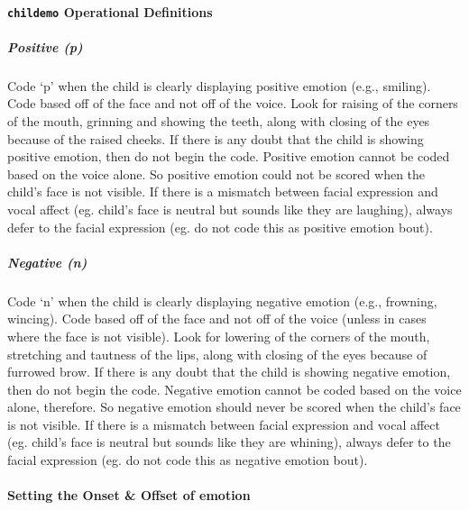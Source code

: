 \documentclass[
]{book}
\begin{document}
\hypertarget{childemo-operational-definitions}{%
\paragraph*{\texorpdfstring{\texttt{childemo} Operational Definitions}{childemo Operational Definitions}}\label{childemo-operational-definitions}}

\hypertarget{child_pos_emo}{%
\subparagraph*{Positive (p)}\label{child_pos_emo}}

Code `p' when the child is clearly displaying positive emotion (e.g., smiling). Code based off of the face and not off of the voice. Look for raising of the corners of the mouth, grinning and showing the teeth, along with closing of the eyes because of the raised cheeks. If there is any doubt that the child is showing positive emotion, then do not begin the code.
Positive emotion cannot be coded based on the voice alone. So positive emotion could not be scored when the child's face is not visible. If there is a mismatch between facial expression and vocal affect (eg. child's face is neutral but sounds like they are laughing), always defer to the facial expression (eg. do not code this as positive emotion bout).

\hypertarget{child_neg_emo}{%
\subparagraph*{Negative (n)}\label{child_neg_emo}}

Code `n' when the child is clearly displaying negative emotion (e.g., frowning, wincing). Code based off of the face and not off of the voice (unless in cases where the face is not visible). Look for lowering of the corners of the mouth, stretching and tautness of the lips, along with closing of the eyes because of furrowed brow. If there is any doubt that the child is showing negative emotion, then do not begin the code.
Negative emotion cannot be coded based on the voice alone, therefore. So negative emotion should never be scored when the child's face is not visible. If there is a mismatch between facial expression and vocal affect (eg. child's face is neutral but sounds like they are whining), always defer to the facial expression (eg. do not code this as negative emotion bout).

\hypertarget{setting-the-onset-offset-of-emotion}{%
\paragraph*{Setting the Onset \& Offset of emotion}\label{setting-the-onset-offset-of-emotion}}
\end{document}
